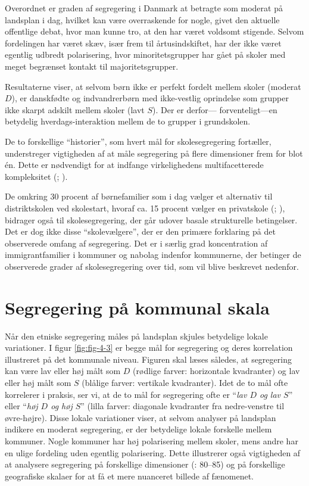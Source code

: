 \documentclass[
]{book}
\begin{document}
Overordnet er graden af segregering i Danmark at betragte som moderat på landsplan i dag, hvilket kan være overraskende for nogle, givet den aktuelle offentlige debat, hvor man kunne tro, at den har været voldsomt stigende. Selvom fordelingen har været skæv, især frem til årtusindskiftet, har der ikke været egentlig udbredt polarisering, hvor minoritetsgrupper har gået på skoler med meget begrænset kontakt til majoritetsgrupper.

Resultaterne viser, at selvom børn ikke er perfekt fordelt mellem skoler (moderat \(D\)), er danskfødte og indvandrerbørn med ikke-vestlig oprindelse som grupper ikke skarpt adskilt mellem skoler (lavt \(S\)). Der er derfor--- forventeligt---en betydelig hverdags-interaktion mellem de to grupper i grundskolen.

De to forskellige ``historier'', som hvert mål for skolesegregering fortæller, understreger vigtigheden af at måle segregering på flere dimensioner frem for blot én. Dette er nødvendigt for at indfange virkelighedens multifacetterede kompleksitet (; ).

De omkring 30 procent af børnefamilier som i dag vælger et alternativ til distriktskolen ved skolestart, hvoraf ca. 15 procent vælger en privatskole (; ), bidrager også til skolesegregering, der går udover basale strukturelle betingelser. Det er dog ikke disse ``skolevælgere'', der er den primære forklaring på det observerede omfang af segregering. Det er i særlig grad koncentration af immigrantfamilier i kommuner og nabolag indenfor kommunerne, der betinger de observerede grader af skolesegregering over tid, som vil blive beskrevet nedenfor.

\section{Segregering på kommunal skala}\label{segregering-puxe5-kommunal-skala}

Når den etniske segregering måles på landsplan skjules betydelige lokale variationer. I figur \ref{fig:fig-4-3} er begge mål for segregering og deres korrelation illustreret på det kommunale niveau. Figuren skal læses således, at segregering kan være lav eller høj målt som \(D\) (rødlige farver: horizontale kvadranter) og lav eller høj målt som \(S\) (blålige farver: vertikale kvadranter). Idet de to mål ofte korrelerer i praksis, ser vi, at de to mål for segregering ofte er ``\emph{lav \(D\) og lav \(S\)}'' eller ``\emph{høj \(D\) og høj \(S\)}'' (lilla farver: diagonale kvadranter fra nedre-venstre til øvre-højre). Disse lokale variationer viser, at selvom analyser på landsplan indikere en moderat segregering, er der betydelige lokale forskelle mellem kommuner. Nogle kommuner har høj polarisering mellem skoler, mens andre har en ulige fordeling uden egentlig polarisering. Dette illustrerer også vigtigheden af at analysere segregering på forskellige dimensioner (: 80--85) og på forskellige geografiske skalaer for at få et mere nuanceret billede af fænomenet.
\end{document}
